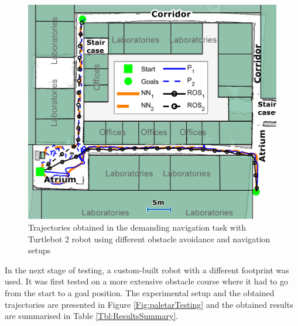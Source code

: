 \begin{figure}
\centering
\includegraphics[width=0.85\columnwidth]{slike/Fig04_12.jpg}
\caption{Trajectories obtained in the demanding navigation task with Turtlebot 2 robot using different obstacle avoidance and navigation setups}
\label{Fig:Trajektorije_hodnik}
\end{figure}

In the next stage of testing, a custom-built robot with a different footprint was used. It was first tested on a more extensive obstacle course where it had to go from the start to a goal position. The experimental setup and the obtained trajectories are presented in Figure \ref{Fig:paletarTesting} and the obtained results are summarised in Table \ref{Tbl:ResultsSummary}.

